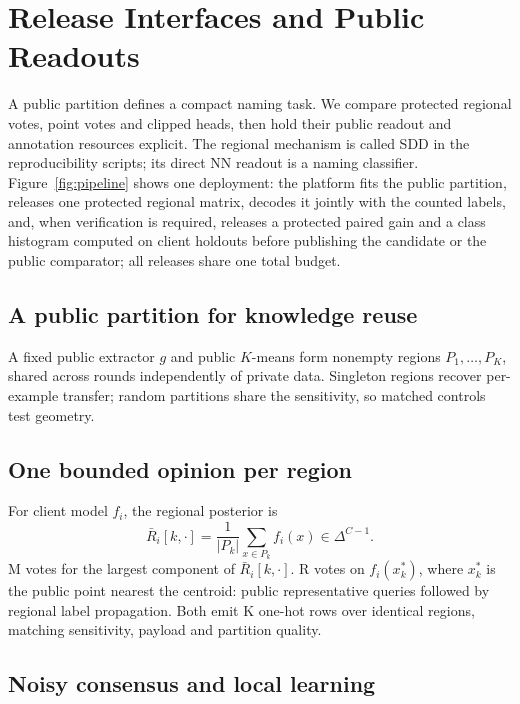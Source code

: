 \section{Release Interfaces and Public Readouts}
\label{sec:method}

A public partition defines a compact naming task. We compare protected
regional votes, point votes and clipped heads, then hold their public readout
and annotation resources explicit. The regional mechanism is called SDD in
the reproducibility scripts; its direct NN readout is a naming classifier.
Figure~\ref{fig:pipeline} shows one deployment: the platform fits the
public partition, releases one protected regional matrix, decodes it jointly
with the counted labels, and, when verification is required, releases a
protected paired gain and a class histogram computed on client holdouts
before publishing the candidate or the public comparator; all releases share
one total budget.




\subsection{A public partition for knowledge reuse}
\label{sec:method:cluster}

A fixed public extractor $g$ and public $K$-means form nonempty regions
$P_1,\ldots,P_K$, shared across rounds independently of private data.
Singleton regions recover per-example transfer; random partitions share the
sensitivity, so matched controls test geometry.

\subsection{One bounded opinion per region}
\label{sec:method:report}

For client model $f_i$, the regional posterior is
\begin{equation}
\bar R_i[k,\cdot]=\frac1{|P_k|}\sum_{x\in P_k}f_i(x)
\in\Delta^{C-1}.\label{eq:report}
\end{equation}
M votes for the largest component of $\bar R_i[k,\cdot]$.
R votes on $f_i(x_k^*)$, where $x_k^*$ is the public point nearest the
centroid: public representative queries followed by regional label propagation.
Both emit K one-hot rows over identical regions, matching sensitivity,
payload and partition quality.

\subsection{Noisy consensus and local learning}
\label{sec:method:agg}

